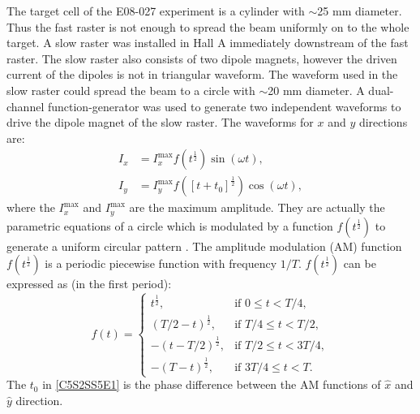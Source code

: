 The target cell of the E08-027 experiment is a cylinder with $\sim$25 mm diameter. Thus the fast raster is not enough to spread the beam uniformly on to the whole target. A slow raster was installed in Hall A immediately downstream of the fast raster. The slow raster also consists of two dipole magnets, however the driven current of the dipoles is not in triangular waveform. The waveform used in the slow raster could spread the beam to a circle with $\sim$20 mm diameter. A dual-channel function-generator was used to generate two independent waveforms to drive the dipole magnet of the slow raster. The waveforms for $x$ and $y$ directions are:
\begin{align} \label{C5S2SS5E1}
I_x & = I_x^{\mathrm{max}}f(t^{\frac{1}{2}})\sin(\omega t), \\ \label{C5S2SS5E2}
I_y & = I_y^{\mathrm{max}}f([t+t_0]^{\frac{1}{2}})\cos(\omega t),
\end{align}
where the $I_x^{\mathrm{max}}$ and $I_y^{\mathrm{max}}$ are the maximum amplitude. They are actually the parametric equations of a circle which is modulated by a function $f(t^{\frac{1}{2}})$ to generate a uniform circular pattern \cite{Yan2005}. The amplitude modulation (AM) function $f(t^{\frac{1}{2}})$ is a periodic piecewise function with frequency $1/T$. $f(t^{\frac{1}{2}})$ can be expressed as (in the first period):
\begin{equation} \label{C5S2SS5E3}
f(t) =
\begin{cases}
t^{\frac{1}{2}}, & \text{if } 0\leq t<T/4, \\
(T/2-t)^{\frac{1}{2}}, & \text{if } T/4\leq t<T/2, \\
-(t-T/2)^{\frac{1}{2}}, & \text{if } T/2\leq t<3T/4, \\
-(T-t)^{\frac{1}{2}}, & \text{if } 3T/4\leq t<T.
\end{cases}
\end{equation}
The $t_0$ in \cref{C5S2SS5E1} is the phase difference between the AM functions of $\hat{x}$ and $\hat{y}$ direction.

